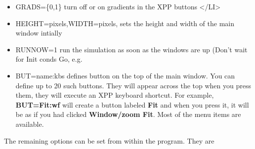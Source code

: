 \begin{itemize}
\item GRADS=\{0,1\} turn off or on gradients in the XPP buttons </LI>
\item HEIGHT=pixels,WIDTH=pixels, sets the height and width of the main window intially 
\item RUNNOW=1 run the simulation as soon as the windows are up (Don't wait for Init conds Go, e.g.
\item BUT=name:kbs defines button on the top of the main window. You
can define up to 20 such buttons. They will appear across the top  when
you press them, they will execute an XPP keyboard shortcut. For
example,  {\bf BUT=Fit:wf} will create a button labeled {\bf Fit}
and when you press it, it will be as if you had clicked {\bf 
Window/zoom Fit}.  Most of the menu items are available.
\end{itemize}

The remaining options can be set from within the program. They are 

